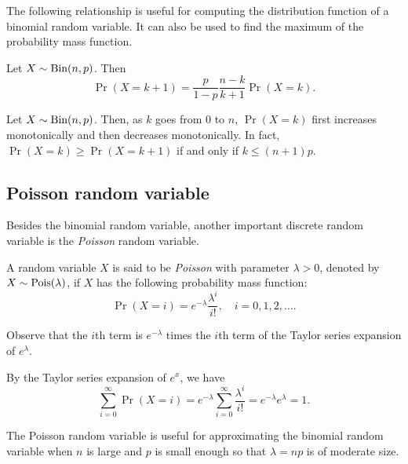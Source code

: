 \documentclass{article}
\begin{document}
The following relationship is useful for computing the distribution function of a binomial random variable.
It can also be used to find the maximum of the probability mass function.

\begin{proposition}[Relationship between $\Pr(X = k + 1)$ and $\Pr(X = k)$]
  Let $X \sim \textnormal{Bin}(n, p)$. Then
  \[
    \Pr(X = k + 1) = \frac{p}{1 - p} \frac{n - k}{k + 1} \Pr(X = k).
  \]
\end{proposition}

\begin{corollary}
  Let $X \sim \textnormal{Bin}(n, p)$.
  Then, as $k$ goes from $0$ to $n$, $\Pr(X = k)$ first increases monotonically and then decreases monotonically.
  In fact, $\Pr(X = k) \geq \Pr(X = k + 1)$ if and only if $k \leq (n + 1)p$.
\end{corollary}

\subsection{Poisson random variable}

Besides the binomial random variable, another important discrete random variable is the \emph{Poisson} random variable.

\begin{definition}
  A random variable $X$ is said to be \emph{Poisson} with parameter $\lambda > 0$, denoted by $X \sim \textnormal{Pois}(\lambda)$, if $X$ has the following probability mass function:
  \[
    \Pr(X = i) = e^{-\lambda} \frac{\lambda^i}{i!}, \quad i = 0, 1, 2, \ldots.
  \]
\end{definition}
Observe that the $i$th term is $e^{-\lambda}$ times the $i$th term of the Taylor series expansion of $e^\lambda$.

\begin{remark}
  By the Taylor series expansion of $e^x$, we have
  \[
    \sum_{i = 0}^\infty \Pr(X = i) = e^{-\lambda} \sum_{i = 0}^\infty \frac{\lambda^i}{i!} = e^{-\lambda} e^\lambda = 1.
  \]
\end{remark}

The Poisson random variable is useful for approximating the binomial random variable when $n$ is large and $p$ is small enough so that $\lambda = np$ is of moderate size.
\end{document}
